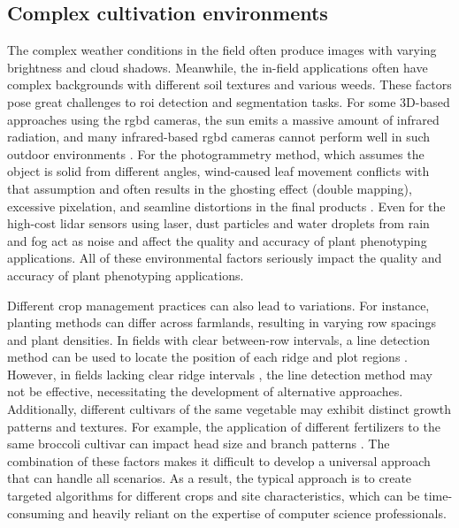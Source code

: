 \subsection{Complex cultivation environments} \label{sec:complexenv}
The complex weather conditions in the field often produce images with varying brightness and cloud shadows. Meanwhile, the in-field applications often have complex backgrounds with different soil textures and various weeds. These factors pose great challenges to \gls{roi} detection and segmentation tasks. For some 3D-based approaches using the \gls{rgbd} cameras, the sun emits a massive amount of infrared radiation, and many infrared-based \gls{rgbd} cameras cannot perform well in such outdoor environments \citep{tolgyessy_evaluation_2021}. For the photogrammetry method, which assumes the object is solid from different angles, wind-caused leaf movement conflicts with that assumption and often results in the ghosting effect (double mapping), excessive pixelation, and seamline distortions in the final products \citep{duan_comparison_2017,lin_new_2021}. Even for the high-cost \gls{lidar} sensors using laser, dust particles and water droplets from rain and fog act as noise and affect the quality and accuracy of plant phenotyping applications. All of these environmental factors seriously impact the quality and accuracy of plant phenotyping applications.

Different crop management practices can also lead to variations. For instance, planting methods can differ across farmlands, resulting in varying row spacings and plant densities. In fields with clear between-row intervals, a line detection method can be used to locate the position of each ridge and plot regions \citep[Fig.~1]{tresch_easympe_2019}. However, in fields lacking clear ridge intervals \citep[Fig.~3]{faye_toolbox_2016}, the line detection method may not be effective, necessitating the development of alternative approaches. Additionally, different cultivars of the same vegetable may exhibit distinct growth patterns and textures. For example, the application of different fertilizers to the same broccoli cultivar can impact head size and branch patterns \citep{nishida_estimation_2023}. The combination of these factors makes it difficult to develop a universal approach that can handle all scenarios. As a result, the typical approach is to create targeted algorithms for different crops and site characteristics, which can be time-consuming and heavily reliant on the expertise of computer science professionals.

